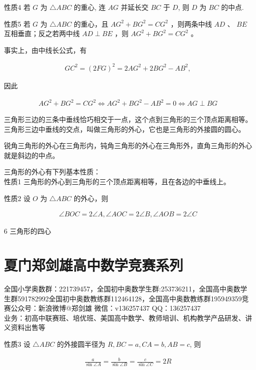 \documentclass[10pt]{article}
\begin{document}
性质4 若 $G$ 为 $\triangle A B C$ 的重心, 连 $A G$ 并延长交 $B C$ 于 $D$, 则 $D$ 为 $B C$ 的中点.

性质5 若 $G$ 为 $\triangle A B C$ 的重心，且 $A G^{2}+B G^{2}=C G^{2}$ ，则两条中线 $A D$ 、 $B E$ 互相垂直；反之若两中线 $A D \perp B E$ ，则 $A G^{2}+B G^{2}=C G^{2}$ 。

事实上，由中线长公式，有

\begin{align*}
G C^{2}=(2 F G)^{2}=2 A G^{2}+2 B G^{2}-A B^{2},
\end{align*}

因此

\begin{align*}
A G^{2}+B G^{2}=C G^{2} \Leftrightarrow A G^{2}+B G^{2}-A B^{2}=0 \Leftrightarrow A G \perp B G
\end{align*}

三角形三边的三条中垂线恰巧相交于一点，这个点到三角形的三个顶点距离相等。三角形三边中垂线的交点，叫做三角形的外心，它也是三角形的外接圆的圆心。

锐角三角形的外心在三角形内，钝角三角形的外心在三角形外，直角三角形的外心就是斜边的中点。

三角形的外心有下列基本性质：\\
性质1 三角形的外心到三角形的三个顶点距离相等，且在各边的中垂线上。

性质2 设 $O$ 为 $\triangle A B C$ 的外心，则

\begin{align*}
\angle B O C=2 \angle A, \angle A O C=2 \angle B, \angle A O B=2 \angle C
\end{align*}

6 三角形的四心

\section*{夏门郑剑雄高中数学竞赛系列}
全国小学奥数群：221739457，全国初中奥数学生群:253736211，全国高中奥数学生群591782992全国初中奥数教练群112464128，全国高中奥数教练群195949359竞赛公众号：新浪微博@郑剑雄 微信：v136257437 QQ：136257437\\
业务：初高中联赛班、培优班、美国高中数学、教师培训、机构教学产品研发、讲义资料出售等

性质3 设 $\triangle A B C$ 的外接圆半径为 $R, B C=a, C A=b, A B=c$, 则

\begin{align*}
\frac{a}{\sin \angle A}=\frac{b}{\sin \angle B}=\frac{c}{\sin \angle C}=2 R \tag{6-4}
\end{align*}
\end{document}
